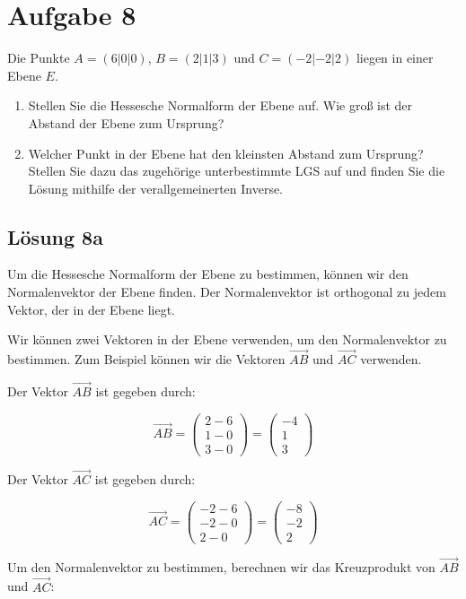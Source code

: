 \documentclass[main.tex]{subfiles}
\begin{document}
\section{Aufgabe 8}
Die Punkte $A=(6|0|0)$, $B=(2|1|3)$ und $C=(-2|-2|2)$ liegen in einer Ebene $E$.
\begin{enumerate}
	\item Stellen Sie die Hessesche Normalform der Ebene auf. Wie groß ist der Abstand der Ebene zum Ursprung?
	\item Welcher Punkt in der Ebene hat den kleinsten Abstand zum Ursprung? Stellen Sie dazu das zugehörige unterbestimmte LGS auf und finden Sie die Lösung mithilfe der verallgemeinerten Inverse.
\end{enumerate}

\subsection{Lösung 8a}
Um die Hessesche Normalform der Ebene zu bestimmen, können wir den Normalenvektor der Ebene finden. Der Normalenvektor ist orthogonal zu jedem Vektor, der in der Ebene liegt. 

Wir können zwei Vektoren in der Ebene verwenden, um den Normalenvektor zu bestimmen. Zum Beispiel können wir die Vektoren $\overrightarrow{AB}$ und $\overrightarrow{AC}$ verwenden.

Der Vektor $\overrightarrow{AB}$ ist gegeben durch:

$$\overrightarrow{AB} = \begin{pmatrix} 2-6 \\ 1-0 \\ 3-0 \end{pmatrix} = \begin{pmatrix} -4 \\ 1 \\ 3 \end{pmatrix}$$

Der Vektor $\overrightarrow{AC}$ ist gegeben durch:

$$\overrightarrow{AC} = \begin{pmatrix} -2-6 \\ -2-0 \\ 2-0 \end{pmatrix} = \begin{pmatrix} -8 \\ -2 \\ 2 \end{pmatrix}$$

Um den Normalenvektor zu bestimmen, berechnen wir das Kreuzprodukt von $\overrightarrow{AB}$ und $\overrightarrow{AC}$:
\end{document}
